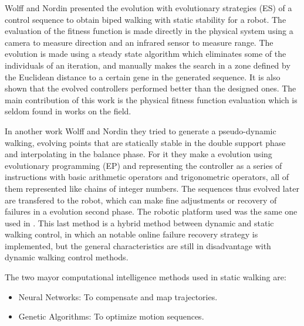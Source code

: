 Wolff and Nordin \cite{Wolff01Evolution} presented the evolution with evolutionary strategies (ES) of a control sequence to obtain biped walking with static stability for a robot. The evaluation of the fitness function is made directly in the physical system using a camera to measure direction and an infrared sensor to measure range. The evolution is made using a steady state algorithm which eliminates some of the individuals of an iteration, and manually makes the search in a zone defined by the Euclidean distance to a certain gene in the generated sequence. It is also shown that the evolved controllers performed better than the designed ones. The main contribution of this work is the physical fitness function evaluation which is seldom found in works on the field.


In another work Wolff and Nordin \cite{Wolff03Learning} they tried to generate a pseudo-dynamic walking, evolving points that are statically stable in the double support phase and interpolating in the balance phase. For it they make a evolution using evolutionary programming (EP) and representing the controller as a series of instructions with basic arithmetic operators and trigonometric operators, all of them represented like chains of integer numbers. The sequences thus evolved later are transfered to the robot, which can make fine adjustments or recovery of failures in a evolution second phase. The robotic platform used was the same one used in \cite{Wolff01Evolution}. This last method is a hybrid method between dynamic and static walking control, in which an notable online failure recovery strategy is implemented, but the general characteristics are still in disadvantage with dynamic walking control methods.

The two mayor computational intelligence methods used in static walking are:
\begin{itemize}
\item Neural Networks: To compensate and map trajectories.
\item Genetic Algorithms: To optimize motion sequences.
\end{itemize}

